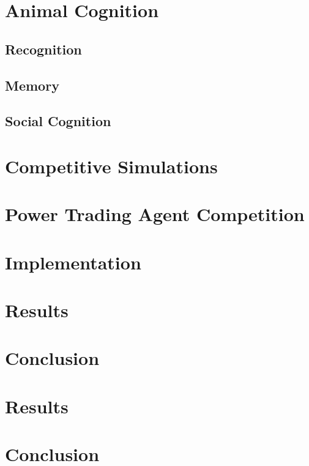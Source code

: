 \chapter{Animal Cognition}
\section{Recognition}
\section{Memory}
\section{Social Cognition}

\chapter{Competitive Simulations}%

\chapter{Power Trading Agent Competition}


\chapter{Implementation}


\chapter{Results}
\chapter{Conclusion}










\chapter{Results}

\chapter{Conclusion}
